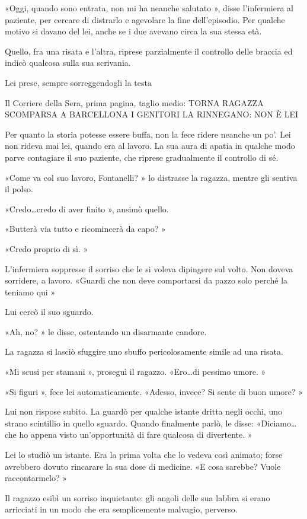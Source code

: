 «Oggi, quando sono entrata, non mi ha neanche salutato », disse l'infermiera al paziente, per cercare di distrarlo e agevolare la fine dell'episodio. Per qualche motivo si davano del lei, anche se i due avevano circa la sua stessa età.

Quello, fra una risata e l'altra, riprese parzialmente il controllo delle braccia ed indicò qualcosa sulla sua scrivania.

Lei prese, sempre sorreggendogli la testa

Il Corriere della Sera, prima pagina, taglio medio:
TORNA RAGAZZA SCOMPARSA A BARCELLONA
I GENITORI LA RINNEGANO: NON È LEI

Per quanto la storia potesse essere buffa, non la fece ridere neanche un po'. Lei non rideva mai lei, quando era al lavoro. La sua aura di apatia in qualche modo parve contagiare il suo paziente, che riprese gradualmente il controllo di sé.

«Come va col suo lavoro, Fontanelli? » lo distrasse la ragazza, mentre gli sentiva il polso.

«Credo\ldots credo di aver finito », ansimò quello.

«Butterà via tutto e ricomincerà da capo? »

«Credo proprio di sì. »

L'infermiera soppresse il sorriso che le si voleva dipingere sul volto. Non doveva sorridere, a lavoro. «Guardi che non deve comportarsi da pazzo solo perché la teniamo qui »

Lui cercò il suo sguardo.

«Ah, no? » le disse, ostentando un disarmante candore.

La ragazza si lasciò sfuggire uno sbuffo pericolosamente simile ad una risata.

«Mi scusi per stamani », proseguì il ragazzo. «Ero\ldots di pessimo umore. »

«Si figuri », fece lei automaticamente. «Adesso, invece? Si sente di buon umore? »

Lui non rispose subito. La guardò per qualche istante dritta negli occhi, uno strano scintillio in quello sguardo. Quando finalmente parlò, le disse: «Diciamo\ldots che ho appena visto un'opportunità di fare qualcosa di divertente. »

Lei lo studiò un istante. Era la prima volta che lo vedeva così animato; forse avrebbero dovuto rincarare la sua dose di medicine. «E cosa sarebbe? Vuole raccontarmelo? »

Il ragazzo esibì un sorriso inquietante: gli angoli delle sua labbra si erano arricciati in un modo che era semplicemente malvagio, perverso.

